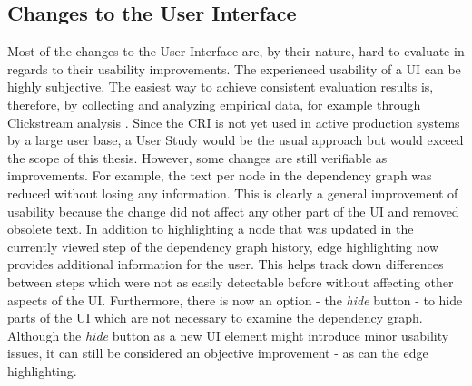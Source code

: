 	\subsection{Changes to the User Interface}
	Most of the changes to the User Interface are, by their nature, hard to evaluate in regards to their usability improvements. The experienced usability of a UI can be highly subjective. The easiest way to achieve consistent evaluation results is, therefore, by collecting and analyzing empirical data, for example through Clickstream analysis \cite{Clickstream}. Since the CRI is not yet used in active production systems by a large user base, a User Study would be the usual approach but would exceed the scope of this thesis. However, some changes are still verifiable as improvements. For example, the text per node in the dependency graph was reduced without losing any information. This is clearly a general improvement of usability because the change did not affect any other part of the UI and removed obsolete text. 
	In addition to highlighting a node that was updated in the currently viewed step of the dependency graph history, edge highlighting now provides additional information for the user. This helps track down differences between steps which were not as easily detectable before without affecting other aspects of the UI. Furthermore, there is now an option - the \emph{hide} button - to hide parts of the UI which are not necessary to examine the dependency graph. Although the \emph{hide} button as a new UI element might introduce minor usability issues, it can still be considered an objective improvement - as can the edge highlighting.
	

